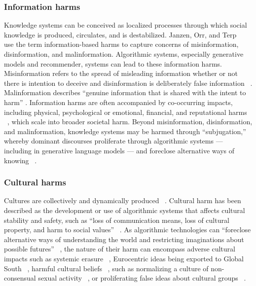 \subsubsection{Information harms} Knowledge systems can be conceived as localized processes through which social knowledge is produced, circulates, and is destabilized. Janzen, Orr, and Terp ~\cite{janzen2022cognitive} use the term information-based harms to capture concerns of misinformation, disinformation, and malinformation. Algorithmic systems, especially generative models and recommender, systems can lead to these information harms. Misinformation refers to the spread of misleading information whether or not there is intention to deceive and disinformation is deliberately false information ~\cite{Neumann_De-Arteaga_Fazelpour_2022, Southwell_Brennen_Paquin_Boudewyns_Zeng_2022, Treen_Williams_ONeill_2020, Wardle_and_Derakhshan_2017}. Malinformation describes “genuine information that is shared with the intent to harm” \cite[p. 2]{janzen2022cognitive}. Information harms are often accompanied by co-occurring impacts, including physical, psychological or emotional, financial, and reputational harms ~\cite{Agrafiotis_Nurse_Goldsmith_Creese_Upton_2018, Tran_Valecha_Rad_Rao_2020, Wardle_Singerman_2021, Wright_Williams_Elizarova_Dahne_Bian_Zhao_Tan_2021}, which scale into broader societal harm. Beyond misinformation, disinformation, and malinformation, knowledge systems may be harmed through “subjugation,” whereby dominant discourses proliferate through algorithmic systems — including in generative language models \cite{Weidinger2022} — and foreclose alternative ways of knowing ~\cite{galaz2021artificial, Sadowski_Selinger_2014, Satra_2020}.

\subsubsection{Cultural harms} Cultures are collectively and dynamically produced ~\cite{Irani_Vertesi_Dourish_Philip_Grinter_2010}. Cultural harm has been described as the development or use of algorithmic systems that affects cultural stability and safety, such as “loss of communication means, loss of cultural property, and harm to social values” ~\cite[p. 30]{Agrafiotis_2016}. As algorithmic technologies can “foreclose alternative ways of understanding the world and restricting imaginations about possible futures” ~\cite[p. 162]{Sadowski_Selinger_2014}, the nature of their harm can encompass adverse cultural impacts such as systemic erasure ~\cite{DeVos_Dhabalia_Shen_Holstein_Eslami_2022}, Eurocentric ideas being exported to Global South ~\cite{Docherty_Biega_2022, Mohamed_Png_Isaac_2020}, harmful cultural beliefs ~\cite{Dobbe_Krendl_Gilbert_Mintz_2021}, such as normalizing a culture of non-consensual sexual activity ~\cite{McGlynn_Rackley_2017}, or proliferating false ideas about cultural groups ~\cite{Dosono_Semaan_2020, Sambasivan_Arnesen_Hutchinson_Doshi_Prabhakaran_2021}.

